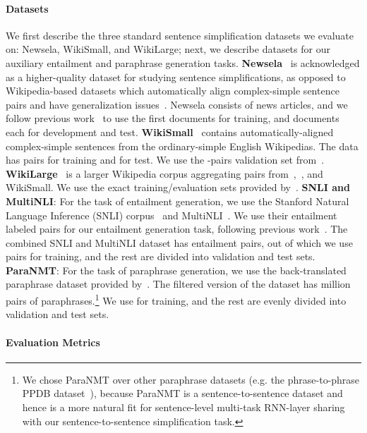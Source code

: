 \documentclass[11pt]{article}
\begin{document}
\paragraph{Datasets}
\label{subsec:datasets}
We first describe the three standard sentence simplification datasets we evaluate on: Newsela, WikiSmall, and WikiLarge; next, we describe datasets for our auxiliary entailment and paraphrase generation tasks. \textbf{Newsela}~\cite{xu2015problems} is acknowledged as a higher-quality dataset for studying sentence simplifications, as opposed to Wikipedia-based datasets which automatically align complex-simple sentence pairs and have generalization issues~\cite{zhang2017dress,xu2015problems,amancio2014analysis,hwang2015aligning,vstajner2015deeper}. Newsela consists of  news articles, 
and we follow previous work~\cite{zhang2017dress} to use the first  documents for training, and  documents each for development and test.
\textbf{WikiSmall}~\cite{Zhu2010AMT} contains automatically-aligned complex-simple sentences from the ordinary-simple English Wikipedias. The data has  pairs for training and  for test. We use the -pairs validation set from~.
\textbf{WikiLarge}~\cite{zhang2017dress} is a larger Wikipedia corpus aggregating pairs from~,~, and WikiSmall. We use the exact training/evaluation sets provided by~.
\textbf{SNLI and MultiNLI}: For the task of entailment generation, we use the Stanford Natural Language Inference (SNLI) corpus~\cite{bowman2016snli} and MultiNLI~\cite{williams2017broad}. We use their entailment labeled pairs for our entailment generation task, following previous work~\cite{pasunuru2017multitask}. The combined SNLI and MultiNLI dataset has  entailment pairs, out of which we use  pairs for training, and the rest are divided into validation and test sets. 
\textbf{ParaNMT}: For the task of paraphrase generation, we use the back-translated paraphrase dataset provided by~. The filtered version of the dataset has  million pairs of paraphrases.\footnote{We chose ParaNMT over other paraphrase datasets (e.g. the phrase-to-phrase PPDB dataset~\cite{ganitkevitch2013ppdb}), because ParaNMT is a sentence-to-sentence dataset and hence is a more natural fit for sentence-level multi-task RNN-layer sharing with our sentence-to-sentence simplification task.} We use  for training, and the rest are evenly divided into validation and test sets.

\paragraph{Evaluation Metrics}
\label{subsec:evaluation}
\end{document}
